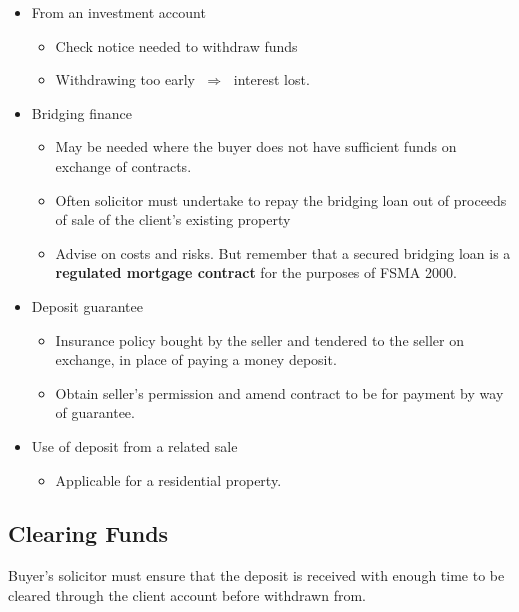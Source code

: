 \documentclass[
]{article}
\providecommand{\tightlist}{%
  \setlength{\itemsep}{0pt}\setlength{\parskip}{0pt}}
\begin{document}
\begin{itemize}
\tightlist
\item
  From an investment account

  \begin{itemize}
  \tightlist
  \item
    Check notice needed to withdraw funds
  \item
    Withdrawing too early {\(\;\Longrightarrow\;\)} interest lost.
  \end{itemize}
\item
  Bridging finance

  \begin{itemize}
  \tightlist
  \item
    May be needed where the buyer does not have sufficient funds on
    exchange of contracts.
  \item
    Often solicitor must undertake to repay the bridging loan out of
    proceeds of sale of the client's existing property
  \item
    Advise on costs and risks. But remember that a secured bridging loan
    is a \textbf{regulated mortgage contract} for the purposes of FSMA
    2000.
  \end{itemize}
\item
  Deposit guarantee

  \begin{itemize}
  \tightlist
  \item
    Insurance policy bought by the seller and tendered to the seller on
    exchange, in place of paying a money deposit.
  \item
    Obtain seller's permission and amend contract to be for payment by
    way of guarantee.
  \end{itemize}
\item
  Use of deposit from a related sale

  \begin{itemize}
  \tightlist
  \item
    Applicable for a residential property.
  \end{itemize}
\end{itemize}

\hypertarget{clearing-funds}{%
\subsection{Clearing Funds}\label{clearing-funds}}

Buyer's solicitor must ensure that the deposit is received with enough
time to be cleared through the client account before withdrawn from.
\end{document}
